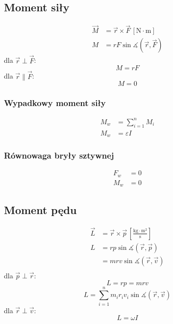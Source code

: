 \documentclass{article}
\numberwithin{equation}{section}
\newcommand{\unit}[1]{\, \left[\mathrm{#1}\right]}
\begin{document}
    \subsection{Moment siły}
      \begin{align}
        \vec M &= \vec r\times\vec F \unit{N\cdot m}\\
        M &= rF\sin\measuredangle\left(\vec r, \vec F\right)
      \end{align}
      dla $\vec r \perp \vec F$:
      \begin{equation}
        M = rF
      \end{equation}
      dla $\vec r \parallel \vec F$:
      \begin{equation}
        M = 0
      \end{equation}
      \subsubsection{Wypadkowy moment siły}
        \begin{align}
          M_w &= \sum_{i=1}^n M_i\\
          M_w &= \varepsilon I
        \end{align}
      \subsubsection{Równowaga bryły sztywnej}
        \begin{align}
          F_w &= 0\\
          M_w &= 0
        \end{align}
    \subsection{Moment pędu}
      \begin{align}
        \vec L &= \vec r \times\vec p \unit{\frac{kg\cdot m^2}{s}}\\
        L &= rp\sin\measuredangle\left(\vec r,\vec p\right)\\
          &= mrv\sin\measuredangle\left(\vec r,\vec v\right)\\
      \end{align}
      dla $\vec p \perp \vec r$:
      \begin{equation}
        L = rp = mrv
      \end{equation}
      \begin{equation}
        L = \sum_{i=1}^n m_ir_iv_i\sin\measuredangle\left(\vec r,\vec v\right)
      \end{equation}
      dla $\vec r \perp \vec v$:
      \begin{equation}
        L = \omega I
      \end{equation}
\end{document}
